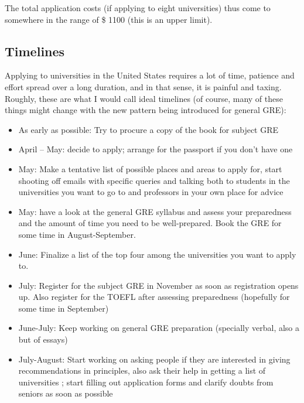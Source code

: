 \documentclass[a4paper]{amsart}
\begin{document}
The total application costs (if applying to eight universities) thus
come to somewhere in the range of \$ 1100 (this is an upper limit).

\subsection{Timelines}

Applying to universities in the United States requires a lot of time,
patience and effort spread over a long duration, and in that sense, it
is painful and taxing. Roughly, these are what I would call ideal timelines
(of course, many of these things might change with the new pattern
being introduced for general GRE):

\begin{itemize}

\item As early as possible: Try to procure a copy of the book for
  subject GRE
\item April -- May: decide to apply; arrange for the passport if you
  don't have one

\item May: Make a tentative list of possible places and areas to apply
  for, start shooting off emails with specific queries and talking
  both to students in the universities you want to go to and
  professors in your own place for advice

\item May: have a look at the general GRE syllabus and assess your
  preparedness and the amount of time you need to be well-prepared. Book
  the GRE for some time in August-September.

\item June: Finalize a list of the top four among the universities
  you want to apply to.

\item July: Register for the subject GRE in November as soon as registration 
  opens up. Also register for the TOEFL after assessing preparedness
  (hopefully for some time in September)

\item June-July: Keep working on general GRE preparation (specially verbal,
  also a but of essays)

\item July-August: Start working on asking people if they are
  interested in giving recommendations in principles, also ask their
  help in getting a list of universities ; start filling out
  application forms and clarify doubts from seniors as soon as
  possible


\end{itemize}
\end{document}
